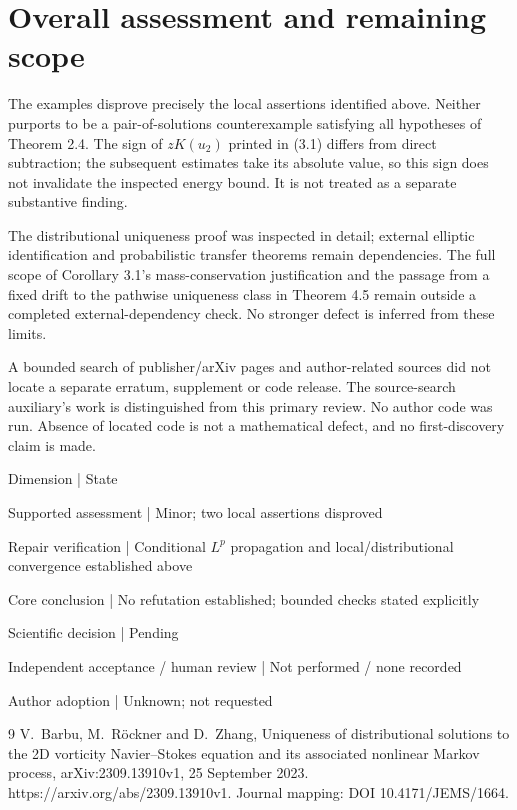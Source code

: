 \documentclass[10pt]{article}
\begin{document}
\section*{Overall assessment and remaining scope}
The examples disprove precisely the local assertions identified above. Neither purports to be a pair-of-solutions counterexample satisfying all hypotheses of Theorem 2.4. The sign of \(zK(u_2)\) printed in (3.1) differs from direct subtraction; the subsequent estimates take its absolute value, so this sign does not invalidate the inspected energy bound. It is not treated as a separate substantive finding.\par
The distributional uniqueness proof was inspected in detail; external elliptic identification and probabilistic transfer theorems remain dependencies. The full scope of Corollary 3.1’s mass-conservation justification and the passage from a fixed drift to the pathwise uniqueness class in Theorem 4.5 remain outside a completed external-dependency check. No stronger defect is inferred from these limits.\par
A bounded search of publisher/arXiv pages and author-related sources did not locate a separate erratum, supplement or code release. The source-search auxiliary’s work is distinguished from this primary review. No author code was run. Absence of located code is not a mathematical defect, and no first-discovery claim is made.\par
Dimension | State\par
Supported assessment | Minor; two local assertions disproved\par
Repair verification | Conditional \(L^p\) propagation and local/distributional convergence established above\par
Core conclusion | No refutation established; bounded checks stated explicitly\par
Scientific decision | Pending\par
Independent acceptance / human review | Not performed / none recorded\par
Author adoption | Unknown; not requested\par
9 V. Barbu, M. Röckner and D. Zhang, Uniqueness of distributional solutions to the 2D vorticity Navier–Stokes equation and its associated nonlinear Markov process, arXiv:2309.13910v1, 25 September 2023. https://arxiv.org/abs/2309.13910v1. Journal mapping: DOI 10.4171/JEMS/1664.\par
\end{document}

